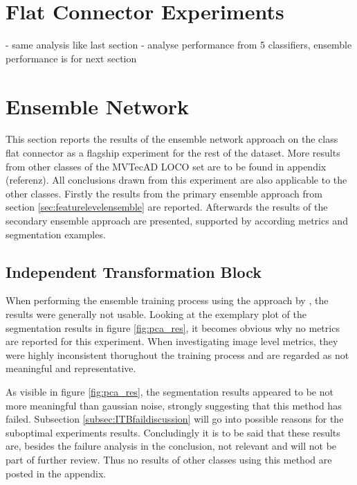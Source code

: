

\section{Flat Connector Experiments}
\label{sec:faltconnectorxperiments}

- same analysis like last section\newline
- analyse performance from 5 classifiers, ensemble performance is for next section


\section{Ensemble Network}
\label{sec:ensembleresults}

This section reports the results of the ensemble network approach on the class flat connector %
as a flagship experiment for the rest of the dataset. More results from other classes of the MVTecAD LOCO \cite{LOCODentsAndScratchesBergmann2022} set are to be found in appendix (referenz). All conclusions drawn from this 
experiment are also applicable to the other classes. Firstly the results from the primary ensemble approach from section \ref{sec:featurelevelensemble} are reported. Afterwards 
the results of the secondary ensemble approach are presented, supported by according metrics and segmentation examples.


\subsection{Independent Transformation Block}
\label{subsec:ITBfail}

When performing the ensemble training process using the approach by \cite{EnsembleHeller2023}, the results were generally not usable. Looking at the exemplary plot of the segmentation 
results in figure \ref{fig:pca_res}, it becomes obvious why no metrics are reported for this experiment. When investigating image level metrics, they were highly inconsistent thorughout 
the training process and are regarded as not meaningful and representative.



As visible in figure \ref{fig:pca_res}, the segmentation results appeared to be not more meaningful than gaussian noise, strongly suggesting that this method has failed. Subsection 
\ref{subsec:ITBfaildiscussion} will go into possible reasons for the suboptimal experiments results. Concludingly it is to be said that these results are, besides the failure analysis 
in the conclusion, not relevant and will not be part of further review. Thus no results of other classes using this method are posted in the appendix.

